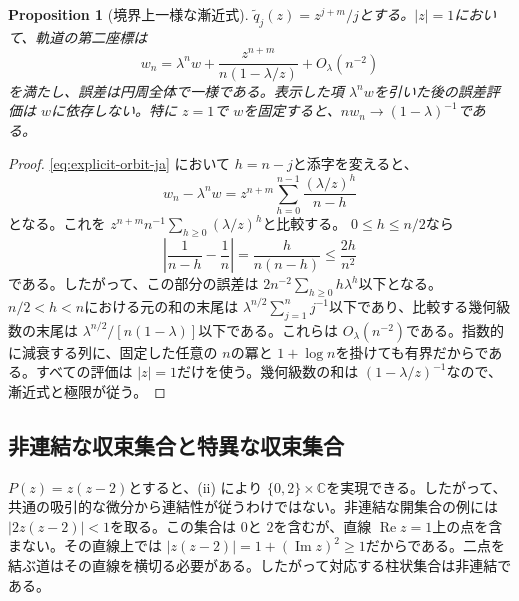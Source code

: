 \documentclass[12pt]{amsart}
\newtheorem{prop}[thm]{Proposition}
\theoremstyle{definition}
\theoremstyle{remark}
\numberwithin{equation}{section}
\newcommand{\C}{\mathbb{C}}
\begin{document}
\begin{prop}[境界上一様な漸近式]\label{prop:boundary-ja}
\allowbreak$\widetilde q_j(z)=z^{j+m}/j$\allowbreak とする。\allowbreak$|z|=1$\allowbreak において、軌道の第二座標は
\begin{equation}\label{eq:boundary-ja}
w_n=\lambda^nw+
\frac{z^{n+m}}{n(1-\lambda/z)}+O_\lambda(n^{-2})
\end{equation}
を満たし、誤差は円周全体で一様である。表示した項 \allowbreak$\lambda^nw$\allowbreak を引いた後の誤差評価は \allowbreak$w$\allowbreak に依存しない。特に \allowbreak$z=1$\allowbreak で \allowbreak$w$\allowbreak を固定すると、\allowbreak$n w_n\to(1-\lambda)^{-1}$\allowbreak である。
\end{prop}
\begin{proof}
\eqref{eq:explicit-orbit-ja} において \allowbreak$h=n-j$\allowbreak と添字を変えると、
\[
w_n-\lambda^nw=z^{n+m}
\sum_{h=0}^{n-1}\frac{(\lambda/z)^h}{n-h}
\]
となる。これを \allowbreak$z^{n+m}n^{-1}\sum_{h\geq0}(\lambda/z)^h$\allowbreak と比較する。
\allowbreak$0\leq h\leq n/2$\allowbreak なら
\[
\left|\frac1{n-h}-\frac1n\right|
=\frac{h}{n(n-h)}\leq\frac{2h}{n^2}
\]
である。したがって、この部分の誤差は \allowbreak$2n^{-2}\sum_{h\geq0}h\lambda^h$\allowbreak 以下となる。
\allowbreak$n/2<h<n$\allowbreak における元の和の末尾は \allowbreak$\lambda^{n/2}\sum_{j=1}^n j^{-1}$\allowbreak 以下であり、比較する幾何級数の末尾は \allowbreak$\lambda^{n/2}/[n(1-\lambda)]$\allowbreak 以下である。これらは \allowbreak$O_\lambda(n^{-2})$\allowbreak である。指数的に減衰する列に、固定した任意の \allowbreak$n$\allowbreak の冪と \allowbreak$1+\log n$\allowbreak を掛けても有界だからである。すべての評価は \allowbreak$|z|=1$\allowbreak だけを使う。幾何級数の和は \allowbreak$(1-\lambda/z)^{-1}$\allowbreak なので、漸近式と極限が従う。
\end{proof}

\subsection{非連結な収束集合と特異な収束集合}
\allowbreak$P(z)=z(z-2)$\allowbreak とすると、(ii) により \allowbreak$\{0,2\}\times\C$\allowbreak を実現できる。したがって、共通の吸引的な微分から連結性が従うわけではない。非連結な開集合の例には \allowbreak$|2z(z-2)|<1$\allowbreak を取る。この集合は \allowbreak$0$\allowbreak と \allowbreak$2$\allowbreak を含むが、直線 \allowbreak$\operatorname{Re}z=1$\allowbreak 上の点を含まない。その直線上では \allowbreak$|z(z-2)|=1+(\operatorname{Im}z)^2\geq1$\allowbreak だからである。二点を結ぶ道はその直線を横切る必要がある。したがって対応する柱状集合は非連結である。
\end{document}
